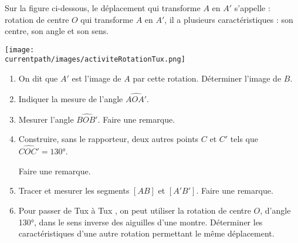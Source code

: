 \begin{activite}
    Sur la figure ci-dessous, le déplacement qui transforme $A$ en $A'$ s'appelle : rotation de centre $O$ qui transforme $A$ en $A'$, il a plusieurs caractéristiques : son centre, son angle et son sens.
    \begin{center}
        \texttt{[image: \\currentpath/images/activiteRotationTux.png]}
    \end{center}
    \begin{enumerate}
        \item On dit que $A'$ est l'image de $A$ par cette rotation. Déterminer l'image de $B$.
        \item Indiquer la mesure de l'angle $\widehat{AOA'}$.
        \item Mesurer l'angle $\widehat{BOB'}$. Faire une remarque.
        \item Construire, sans le rapporteur, deux autres points $C$ et $C'$ tels que $\widehat{COC'}=\ang{130}$.
        
        Faire une remarque.
        \item Tracer et mesurer les segments $[AB]$ et $[A'B']$. Faire une remarque.
        \item Pour passer de Tux  à Tux , on peut utiliser la rotation de centre $O$, d'angle \ang{130}, dans le sens inverse des aiguilles d'une montre.
        Déterminer les caractéristiques d'une autre rotation permettant le même déplacement.
    \end{enumerate}

    \begin{myBox}{}
        \begin{minipage}{\linewidth}
        \end{minipage}
    
        \begin{minipage}{\linewidth}
        \end{minipage}
    \end{myBox}

\end{activite}